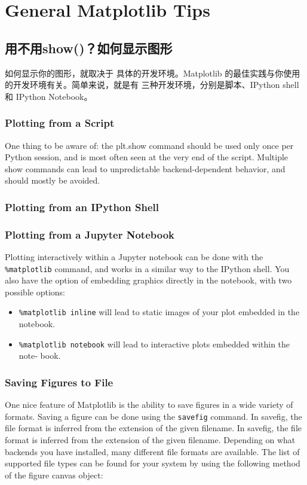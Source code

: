 \chapter{General Matplotlib Tips\label{Ch25}}
\section{用不用show()？如何显示图形}
如何显示你的图形，就取决于
具体的开发环境。Matplotlib 的最佳实践与你使用的开发环境有关。简单来说，就是有
三种开发环境，分别是脚本、IPython shell 和 IPython Notebook。

\subsection*{Plotting from a Script}
One thing to be aware of: the plt.show command should be used only once per
Python session, and is most often seen at the very end of the script. Multiple show
commands can lead to unpredictable backend-dependent behavior, and should
mostly be avoided.

\subsection*{Plotting from an IPython Shell}
\subsection*{Plotting from a Jupyter Notebook}
Plotting interactively within a Jupyter notebook can be done with the \verb|%matplotlib|
command, and works in a similar way to the IPython shell. You also have the option
of embedding graphics directly in the notebook, with two possible options:
\begin{itemize}
    \item \verb|%matplotlib inline| will lead to static images of your plot embedded in the
          notebook.
    \item \verb|%matplotlib notebook| will lead to interactive plots embedded within the note‐
          book.
\end{itemize}

\subsection*{Saving Figures to File}
One nice feature of Matplotlib is the ability to save figures in a wide variety of formats. Saving a figure can be done using the \verb|savefig| command. In savefig, the file format is inferred from the extension of the given filename. In savefig, the file format is inferred from the extension of the given filename.
Depending on what backends you have installed, many different file formats are
available. The list of supported file types can be found for your system by using the
following method of the figure canvas object:

